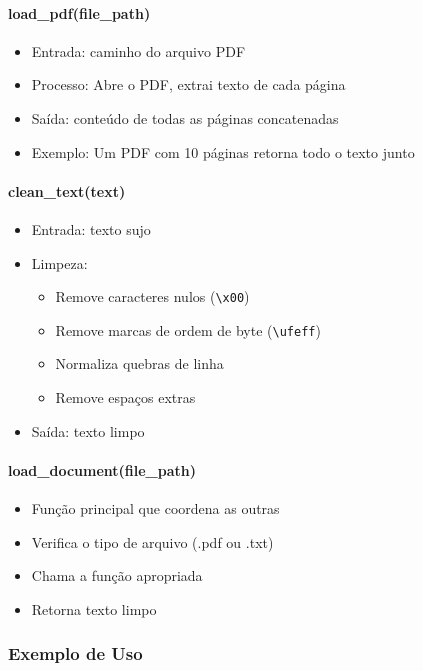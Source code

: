 \documentclass[12pt,a4paper]{article}
\begin{document}
\paragraph{load\_pdf(file\_path)}
\begin{itemize}
    \item Entrada: caminho do arquivo PDF
    \item Processo: Abre o PDF, extrai texto de cada página
    \item Saída: conteúdo de todas as páginas concatenadas
    \item Exemplo: Um PDF com 10 páginas retorna todo o texto junto
\end{itemize}

\paragraph{clean\_text(text)}
\begin{itemize}
    \item Entrada: texto sujo
    \item Limpeza:
    \begin{itemize}
        \item Remove caracteres nulos (\texttt{\textbackslash x00})
        \item Remove marcas de ordem de byte (\texttt{\textbackslash ufeff})
        \item Normaliza quebras de linha
        \item Remove espaços extras
    \end{itemize}
    \item Saída: texto limpo
\end{itemize}

\paragraph{load\_document(file\_path)}
\begin{itemize}
    \item Função principal que coordena as outras
    \item Verifica o tipo de arquivo (.pdf ou .txt)
    \item Chama a função apropriada
    \item Retorna texto limpo
\end{itemize}

\subsubsection{Exemplo de Uso}
\end{document}
